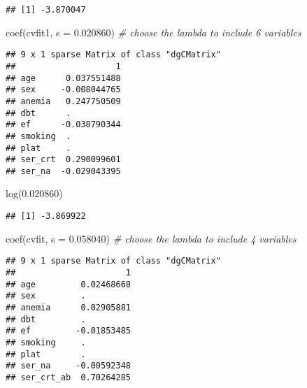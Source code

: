 \documentclass[
]{article}
\newenvironment{Shaded}{\begin{snugshade}}{\end{snugshade}}
\newcommand{\AttributeTok}[1]{\textcolor[rgb]{0.77,0.63,0.00}{#1}}
\newcommand{\CommentTok}[1]{\textcolor[rgb]{0.56,0.35,0.01}{\textit{#1}}}
\newcommand{\FloatTok}[1]{\textcolor[rgb]{0.00,0.00,0.81}{#1}}
\newcommand{\FunctionTok}[1]{\textcolor[rgb]{0.00,0.00,0.00}{#1}}
\newcommand{\NormalTok}[1]{#1}
\newcommand{\SpecialCharTok}[1]{\textcolor[rgb]{0.00,0.00,0.00}{#1}}
\begin{document}
\begin{Shaded}
\end{Shaded}

\begin{verbatim}
## [1] -3.870047
\end{verbatim}

\begin{Shaded}
\begin{Highlighting}[]
\FunctionTok{coef}\NormalTok{(cvfit1, }\AttributeTok{s =} \FloatTok{0.020860}\NormalTok{) }\CommentTok{\# choose the lambda to include 6 variables}
\end{Highlighting}
\end{Shaded}

\begin{verbatim}
## 9 x 1 sparse Matrix of class "dgCMatrix"
##                    1
## age      0.037551488
## sex     -0.008044765
## anemia   0.247750509
## dbt      .          
## ef      -0.038790344
## smoking  .          
## plat     .          
## ser_crt  0.290099601
## ser_na  -0.029043395
\end{verbatim}

\begin{Shaded}
\begin{Highlighting}[]
\FunctionTok{log}\NormalTok{(}\FloatTok{0.020860}\NormalTok{)}
\end{Highlighting}
\end{Shaded}

\begin{verbatim}
## [1] -3.869922
\end{verbatim}

\begin{Shaded}
\begin{Highlighting}[]
\FunctionTok{coef}\NormalTok{(cvfit, }\AttributeTok{s =} \FloatTok{0.058040}\NormalTok{) }\CommentTok{\# choose the lambda to include 4 variables}
\end{Highlighting}
\end{Shaded}

\begin{verbatim}
## 9 x 1 sparse Matrix of class "dgCMatrix"
##                      1
## age         0.02468668
## sex         .         
## anemia      0.02905881
## dbt         .         
## ef         -0.01853485
## smoking     .         
## plat        .         
## ser_na     -0.00592348
## ser_crt_ab  0.70264285
\end{verbatim}
\end{document}
